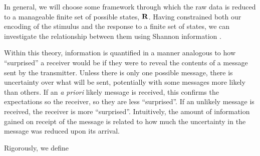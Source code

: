 
In general, we will choose some framework through which the raw data is reduced to a manageable finite set of possible states, $\mathbf{R}$.
Having constrained both our encoding of the stimulus and the response to a finite set of states, we can investigate the relationship between them using Shannon information \citep{Shannon1948}.

Within this theory, information is quantified in a manner analogous to how ``surprised'' a receiver would be if they were to reveal the contents of a message sent by the transmitter.
Unless there is only one possible message, there is uncertainty over what will be sent, potentially with some messages more likely than others.
If an \textit{a priori} likely message is received, this confirms the expectations so the receiver, so they are less ``surprised''.
If an unlikely message is received, the receiver is more ``surprised''.
Intuitively, the amount of information gained on receipt of the message is related to how much the uncertainty in the message was reduced upon its arrival.

Rigorously, we define

